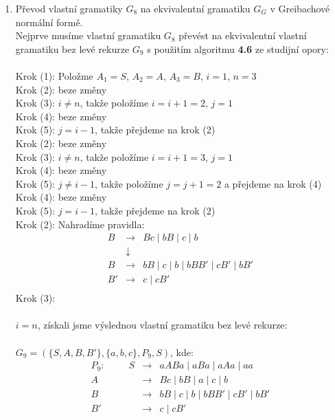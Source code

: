 \documentclass[a4paper,11pt]{article}[24.3.2010]
\begin{document}
\begin{enumerate}
    \newpage
    \renewcommand{\theenumi}{\alph{enumi}}
    \begin{enumerate}
      \item Převod vlastní gramatiky $G_{8}$ na ekvivalentní gramatiku $G_{G}$ v Greibachové normální formě.\\

      Nejprve musíme vlastní gramatiku $G_{8}$ převést na ekvivalentní vlastní gramatiku bez levé rekurze $G_{9}$ s použitím algoritmu \textbf{4.6} ze studijní opory:\\\\
      Krok (1): Položme $A_{1} = S$, $A_{2} = A$, $A_{3} = B$, $i = 1$, $n = 3$ \\
      Krok (2): beze změny\\
      Krok (3): $i \neq n$, takže položíme $i = i+1=2$, $j = 1$\\
      Krok (4): beze změny\\
      Krok (5): $j = i-1$, takže přejdeme na krok (2)\\
      Krok (2): beze změny\\
      Krok (3): $i \neq n$, takže položíme $i = i+1=3$, $j = 1$\\
      Krok (4): beze změny\\
      Krok (5): $j \neq i-1$, takže položíme $j = j+1=2$ a přejdeme na krok (4)\\
      Krok (4): beze změny\\
      Krok (5): $j = i-1$, takže přejdeme na krok (2)\\
      Krok (2): Nahradíme pravidla:
      \begin{eqnarray*}
        B&\rightarrow&Bc \mid bB \mid c \mid b\\
        &\downarrow&\\
        B&\rightarrow&bB \mid c \mid b \mid bBB' \mid cB' \mid bB'\\
        B'&\rightarrow&c \mid cB'\\
      \end{eqnarray*}
      Krok (3): \\\\$i = n$, získali jsme výslednou vlastní gramatiku bez levé rekurze:\\\\ $G_{9} = (\{S,A,B,B'\}, \{a,b,c\},P_{9},S)$, kde:
      \begin{eqnarray*}
      P_{9}: \:\:\:\:\:\:\:\:\:\:\: S&\rightarrow&aABa \mid aBa \mid aAa \mid aa\\
      A&\rightarrow&Bc \mid bB \mid a \mid c \mid b\\
      B&\rightarrow&bB \mid c \mid b \mid bBB' \mid cB' \mid bB'\\
      B'&\rightarrow&c \mid cB'\\
      \end{eqnarray*}
     

\end{enumerate}
\end{enumerate}
\end{document}
